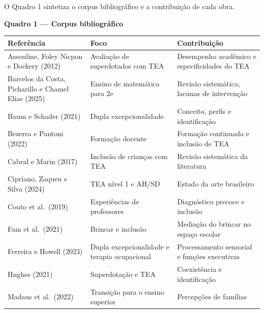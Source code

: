 O Quadro 1 sintetiza o corpus bibliográfico e a contribuição de cada
obra.

\textbf{Quadro 1 --- Corpus bibliográfico}

\begingroup\small

\begin{longtable}[]{@{}
  >{\raggedright\arraybackslash}p{}
  >{\raggedright\arraybackslash}p{}
  >{\raggedright\arraybackslash}p{}@{}}
\toprule\noalign{}
\begin{minipage}[b]{\linewidth}\raggedright
Referência
\end{minipage} & \begin{minipage}[b]{\linewidth}\raggedright
Foco
\end{minipage} & \begin{minipage}[b]{\linewidth}\raggedright
Contribuição
\end{minipage} \\
\midrule\noalign{}
\endhead
\bottomrule\noalign{}
\endlastfoot
Assouline, Foley Nicpon e Dockery (2012) & Avaliação de superdotados com
TEA & Desempenho acadêmico e especificidades do TEA \\
Barcelos da Costa, Picharillo e Chamel Elias (2025) & Ensino de
matemática para 2e & Revisão sistemática; lacunas de intervenção \\
Baum e Schader (2021) & Dupla excepcionalidade & Conceito, perfis e
identificação \\
Bezerra e Pantoni (2022) & Formação docente & Formação continuada e
inclusão de TEA \\
Cabral e Marin (2017) & Inclusão de crianças com TEA & Revisão
sistemática da literatura \\
Cipriano, Zaqueu e Silva (2024) & TEA nível 1 e AH/SD & Estado da arte
brasileiro \\
Couto et al.~(2019) & Experiências de professores & Diagnóstico precoce
e inclusão \\
Fam et al.~(2021) & Brincar e inclusão & Mediação do brincar no espaço
escolar \\
Ferreira e Howell (2023) & Dupla excepcionalidade e terapia ocupacional
& Processamento sensorial e funções executivas \\
Hughes (2021) & Superdotação e TEA & Coexistência e identificação \\
Madaus et al.~(2022) & Transição para o ensino superior & Percepções de
famílias \\

\end{longtable}
